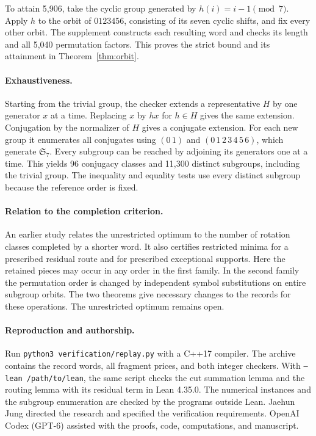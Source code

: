 \documentclass[11pt]{article}
\newcommand{\Sym}{\mathfrak S_7}
\begin{document}
To attain 5,906, take the cyclic group generated by $h(i)=i-1\pmod 7$. Apply $h$ to the orbit of $0123456$, consisting of its seven cyclic shifts, and fix every other orbit. The supplement constructs each resulting word and checks its length and all 5,040 permutation factors. This proves the strict bound and its attainment in Theorem~\ref{thm:orbit}.

\paragraph{Exhaustiveness.} Starting from the trivial group, the checker extends a representative $H$ by one generator $x$ at a time. Replacing $x$ by $hx$ for $h\in H$ gives the same extension. Conjugation by the normalizer of $H$ gives a conjugate extension. For each new group it enumerates all conjugates using $(0\,1)$ and $(0\,1\,2\,3\,4\,5\,6)$, which generate $\Sym$. Every subgroup can be reached by adjoining its generators one at a time. This yields 96 conjugacy classes and 11,300 distinct subgroups, including the trivial group. The inequality and equality tests use every distinct subgroup because the reference order is fixed.

\paragraph{Relation to the completion criterion.} An earlier study \cite{jung} relates the unrestricted optimum to the number of rotation classes completed by a shorter word. It also certifies restricted minima for a prescribed residual route and for prescribed exceptional supports. Here the retained pieces may occur in any order in the first family. In the second family the permutation order is changed by independent symbol substitutions on entire subgroup orbits. The two theorems give necessary changes to the records for these operations. The unrestricted optimum remains open.

\paragraph{Reproduction and authorship.} Run \texttt{python3 verification/replay.py} with a C++17 compiler. The archive contains the record words, all fragment prices, and both integer checkers. With \texttt{--lean /path/to/lean}, the same script checks the cut summation lemma and the routing lemma with its residual term in Lean 4.35.0. The numerical instances and the subgroup enumeration are checked by the programs outside Lean. Jaehun Jung directed the research and specified the verification requirements. OpenAI Codex (GPT-6) assisted with the proofs, code, computations, and manuscript.
\end{document}
